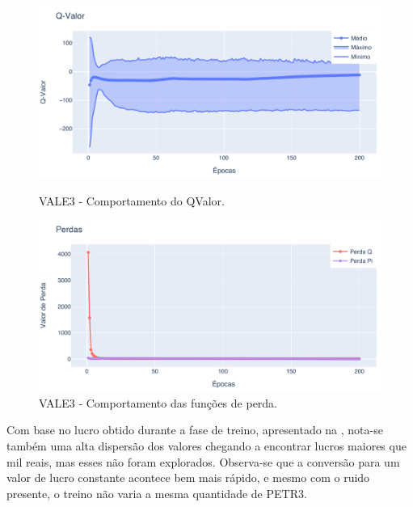 \begin{figure}[htbp]
    \centering 
    \begin{minipage}[b]{0.45\linewidth}
        \includegraphics[width=\linewidth]{img/ddpg/vale3/clean/qval}
        \caption{VALE3 - Comportamento do QValor.} 
        \label{vale_clean_qval}
    \end{minipage}
    \quad
    \begin{minipage}[b]{0.45\linewidth}
        \includegraphics[width=\linewidth]{img/ddpg/vale3/clean/loss}
        \caption{VALE3 - Comportamento das funções de perda.}
        \label{vale_clean_loss}
    \end{minipage}
\end{figure}

Com base no lucro obtido durante a fase de treino, apresentado na , nota-se também uma alta dispersão dos valores chegando a encontrar lucros maiores que mil reais, mas esses não foram explorados. Observa-se que a conversão para um valor de lucro constante acontece bem mais rápido, e mesmo com o ruido presente, o treino não varia a mesma quantidade de PETR3.


